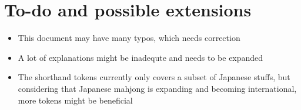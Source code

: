 \documentclass[%
	a4paper%
	,10pt%
	,twoside%
	,notitlepage%
]{article}%
\renewcommand*{\DTMdisplaydate}[4]{%
		\ifnum##4>-1{\DTMenglishshortweekdayname{##4}\space}\fi%
		\DTMtwodigits{##3}\space%
		\DTMenglishshortmonthname{##2}\space%
		##1%
	}%
\begin{document}
\section{To-do and possible extensions}%
% 
	\begin{itemize}%
		\item{}This document may have many typos, which needs correction%
		\item{}A lot of explanations might be inadequte and needs to be expanded%
		\item{}The shorthand tokens currently only covers a subset of Japanese stuffs, but considering that Japanese mahjong is expanding and becoming international, more tokens might be beneficial%
	\end{itemize}%
% 
% 
% 
\printindex{}%
% 
\end{document}
